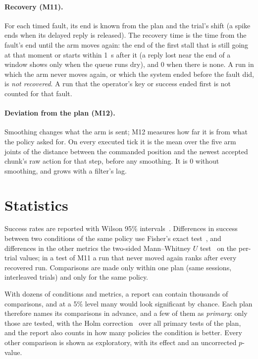 \paragraph{Recovery (M11).} For each timed fault, its end is known from the plan and the trial's shift (a spike ends
when its delayed reply is released). The recovery time is the time from the fault's end until the arm moves again:
the end of the first stall that is still going at that moment or starts within 1~s after it (a reply lost near the end
of a window shows only when the queue runs dry), and 0 when there is none. A run in which the arm never moves again,
or which the system ended before the fault did, is \emph{not recovered}. A run that the operator's key or success ended
first is not counted for that fault.

\paragraph{Deviation from the plan (M12).} Smoothing changes what the arm is sent; M12 measures how far it is from what the
policy asked for. On every executed tick it is the mean over the five arm joints of the distance between the commanded
position and the newest accepted chunk's raw action for that step, before any smoothing. It is 0 without smoothing, and
grows with a filter's lag.


\section{Statistics}\label{sec:stats}

Success rates are reported with Wilson 95\% intervals~\cite{wilson1927}. Differences in success between two conditions
of the same policy use Fisher's exact test~\cite{fisher1935}, and differences in the other metrics the two-sided
Mann--Whitney $U$ test~\cite{mann1947} on the per-trial values; in a test of M11 a run that never moved again ranks
after every recovered run. Comparisons are made only within one plan (same sessions, interleaved trials) and only for
the same policy.

With dozens of conditions and metrics, a report can contain thousands of comparisons, and at a 5\% level many would
look significant by chance. Each plan therefore names its comparisons in advance, and a few of them as \emph{primary}:
only those are tested, with the Holm correction~\cite{holm1979} over all primary tests of the plan, and the report also
counts in how many policies the condition is better. Every other comparison is shown as exploratory, with its effect
and an uncorrected $p$-value.

